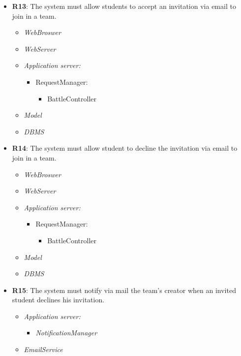 \begin{itemize}
        
        \item \textbf{R13}: The system must allow students to accept an invitation via email to join in a team.
            \begin{itemize}
              \item \textit{WebBroswer}
                \item \textit{WebServer}
                \item \textit{Application server:}\begin{itemize}
                    \item RequestManager:\begin{itemize}
                        \item BattleController
                    \end{itemize}
                \end{itemize}
                \item \textit{Model}
                \item \textit{DBMS}
                \end{itemize}
        
        
        \item \textbf{R14}: The system must allow student to decline the invitation via email to join in a team.
               \begin{itemize}
                \item \textit{WebBroswer}
                \item \textit{WebServer}
                \item \textit{Application server:}\begin{itemize}
                    \item RequestManager:\begin{itemize}
                        \item BattleController
                    \end{itemize}
                \end{itemize}
                \item \textit{Model}
                \item \textit{DBMS}
                \end{itemize}
            
        \item \textbf{R15}: The system must notify via mail the team’s creator when an invited student declines his invitation.
              \begin{itemize}
                 \item \textit{Application server:}\begin{itemize}
                     \item \textit{NotificationManager}
                 \end{itemize}
                \item \textit{EmailService}
                \end{itemize}
            

\end{itemize}

